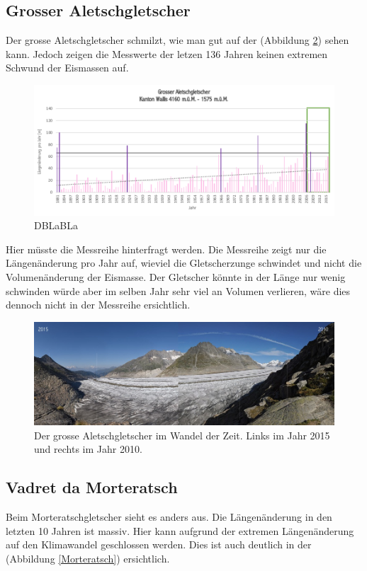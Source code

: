 \begin{refsection}
\subsection{Grosser Aletschgletscher}
Der grosse Aletschgletscher schmilzt, wie man gut auf der (Abbildung \ref{Aletsch}) sehen kann. Jedoch zeigen die Messwerte der letzen 136 Jahren keinen extremen Schwund der Eismassen auf.

\begin{figure}[htbp]
\centering
\includegraphics[width=1.0\textwidth]{extrem/Aletsch.pdf}
\caption{DBLaBLa}
\label{AletschTab}
\end{figure}

Hier müsste die Messreihe hinterfragt werden. Die Messreihe zeigt nur die Längenänderung pro Jahr auf, wieviel die Gletscherzunge schwindet und nicht die Volumenänderung der Eismasse. Der Gletscher könnte in der Länge nur wenig schwinden würde aber im selben Jahr sehr viel an Volumen verlieren, wäre dies dennoch nicht in der Messreihe ersichtlich.

\begin{figure}[htbp]
\centering
\includegraphics[width=1.0\textwidth]{extrem/Aletsch.jpg}
\caption{Der grosse Aletschgletscher im Wandel der Zeit. Links im Jahr 2015 und rechts im Jahr 2010.}
\label{Aletsch}
\end{figure}


\subsection{Vadret da Morteratsch}
Beim Morteratschgletscher sieht es anders aus. Die Längenänderung in den letzten 10 Jahren ist massiv. Hier kann aufgrund der extremen Längenänderung auf den Klimawandel geschlossen werden. Dies ist auch deutlich in der (Abbildung \ref{Morteratsch}) ersichtlich.



\end{refsection}
